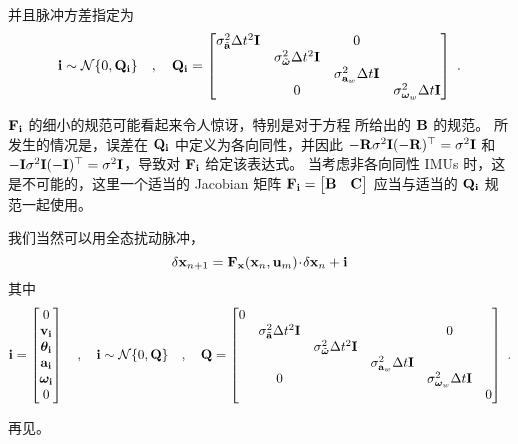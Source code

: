 %
并且脉冲方差指定为
%
\begin{equation}
{\bf i} \sim \mathcal{N}\{0,{\bf Q}_{\bf i}\}
\quad,\quad
{\bf Q}_{\bf i} = \begin{bmatrix}
\sigma_{\tilde{{\bf a}}}^2\Delta t^2{\bf I} &&0&\\
& \sigma_{\tilde{{\bm \omega}}}^2\Delta t^2{\bf I} &&\\
&& \sigma_{{\bf a}_w}^2\Delta t{\bf I} &\\
&0&& \sigma_{{\bm \omega}_w}^2\Delta t{\bf I} 
\end{bmatrix}~.
\end{equation}



${\bf F}_{\bf i}$ 的细小的规范可能看起来令人惊讶，特别是对于方程  所给出的 ${\bf B}$ 的规范。
所发生的情况是，误差在  ${\bf Q}_{\bf i}$ 中定义为各向同性，并因此 $-{\bf R}\sigma^2{\bf I}(-{\bf R})^{\top} = \sigma^2{\bf I}$ 和 $-{\bf I}\sigma^2{\bf I}(-{\bf I})^{\top} = \sigma^2{\bf I}$，导致对 ${\bf F}_{\bf i}$ 给定该表达式。
当考虑非各向同性 IMUs 时，这是不可能的，这里一个适当的 Jacobian 矩阵 ${\bf F}_{\bf i}=\begin{bmatrix}
{\bf B} & {\bf C}
\end{bmatrix}$ 应当与适当的 ${\bf Q}_{\bf i}$ 规范一起使用。


\bigskip
我们当然可以用全态扰动脉冲，
%
\begin{equation}
\delta{\bf x}_{n+1} = {\bf F}_{\bf x}({\bf x}_n, {\bf u}_m)\!\cdot\! \delta{\bf x}_n+{\bf i}
\end{equation}
%
其中
%
\begin{equation}
{\bf i} = \begin{bmatrix}
0 \\
{\bf v}_{\bf i} \\
{\bm \theta}_{\bf i} \\
{\bf a}_{\bf i} \\
{\bm \omega}_{\bf i} \\
0
\end{bmatrix}
\quad,\quad
{\bf i} \sim \mathcal{N}\{0,{\bf Q}\}
\quad,\quad
{\bf Q} = \begin{bmatrix}
0 & \\
& \sigma_{\tilde{{\bf a}}}^2\Delta t^2{\bf I} &&&0&\\
&& \sigma_{\tilde{{\bm \omega}}}^2\Delta t^2{\bf I} &&\\
&&& \sigma_{{\bf a}_w}^2\Delta t{\bf I} &\\
&0&&& \sigma_{{\bm \omega}_w}^2\Delta t{\bf I} \\
&&&&&0
\end{bmatrix}~.
\end{equation}



\bigskip
\bigskip
\bigskip

再见。

